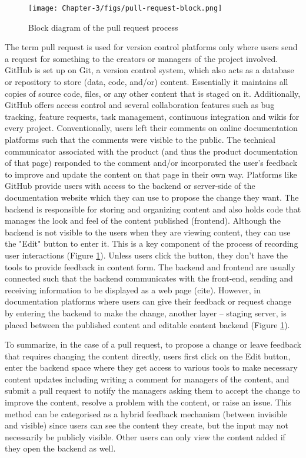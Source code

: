 \begin{figure}[t]
  \begin{center}
      \texttt{[image: Chapter-3/figs/pull-request-block.png]}
  \end{center}
  \caption{Block diagram of the pull request process}
  \label{fig:ch3.2}
\end{figure}

The term pull request is used for version control platforms only where users send a request for something to the creators or managers of the project involved. GitHub is set up on Git, a version control system, which also acts as a database or repository to store (data, code, and/or) content. Essentially it maintains all copies of source code, files, or any other content that is staged on it. Additionally, GitHub offers access control and several collaboration features such as bug tracking, feature requests, task management, continuous integration and wikis for every project. Conventionally, users left their comments on online documentation platforms such that the comments were visible to the public. The technical communicator associated with the product (and thus the product documentation of that page) responded to the comment and/or incorporated the user's feedback to improve and update the content on that page in their own way. Platforms like GitHub provide users with access to the backend or server-side of the documentation website which they can use to propose the change they want. The backend is responsible for storing and organizing content and also holds code that manages the look and feel of the content published (frontend). Although the backend is not visible to the users when they are viewing content, they can use the "Edit" button to enter it. This is a key component of the process of recording user interactions (Figure \ref{fig:ch3.2}). Unless users click the button, they don't have the tools to provide feedback in content form. The backend and frontend are usually connected such that the backend communicates with the front-end, sending and receiving information to be displayed as a web page (cite). However, in documentation platforms where users can give their feedback or request change by entering the backend to make the change, another layer – staging server, is placed between the published content and editable content backend (Figure \ref{fig:ch3.2}).

To summarize, in the case of a pull request, to propose a change or leave feedback that requires changing the content directly, users first click on the Edit button, enter the backend space where they get access to various tools to make necessary content updates including writing a comment for managers of the content, and submit a pull request to notify the managers asking them to accept the change to improve the content, resolve a problem with the content, or raise an issue. This method can be categorised as a hybrid feedback mechanism (between invisible and visible) since users can see the content they create, but the input may not necessarily be publicly visible. Other users can only view the content added if they open the backend as well.

